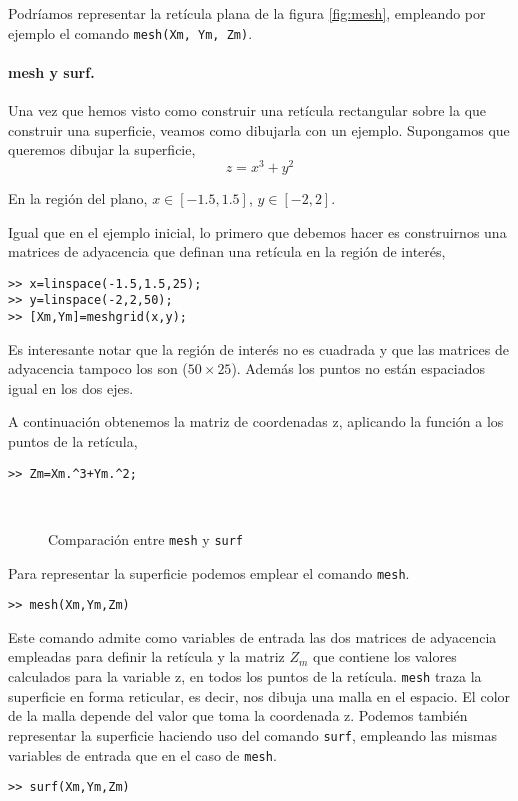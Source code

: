 Podríamos representar la retícula plana de la figura \ref{fig:mesh}, empleando por ejemplo el comando \texttt{mesh(Xm, Ym, Zm)}.

\paragraph{mesh y surf.} Una vez que hemos visto como construir una retícula rectangular sobre la que construir una superficie, veamos como dibujarla con un ejemplo. Supongamos que queremos dibujar la superficie,
\begin{equation*}
z=x^3+y^2
\end{equation*}

En la región del plano, $x\in[-1.5,1.5]$, $y\in[-2,2]$. 

Igual que en el ejemplo inicial, lo primero que debemos hacer es construirnos una matrices de adyacencia que definan una retícula en la región de interés,
\begin{verbatim}
>> x=linspace(-1.5,1.5,25);
>> y=linspace(-2,2,50);
>> [Xm,Ym]=meshgrid(x,y);
\end{verbatim}

Es interesante notar que la región de interés no es cuadrada y que las matrices de adyacencia tampoco los son ($50\times 25$). Además los puntos no están espaciados igual en los dos ejes.

A continuación obtenemos la matriz de coordenadas z, aplicando la función a los puntos de la retícula,

\begin{verbatim}
>> Zm=Xm.^3+Ym.^2;
\end{verbatim}

\begin{figure}[h]
\centering
{} \qquad 
{}\\
\caption{Comparación entre \texttt{mesh} y \texttt{surf}}
\end{figure}

Para representar la superficie podemos emplear el comando \texttt{mesh}. 
\begin{verbatim}
>> mesh(Xm,Ym,Zm)
\end{verbatim}

Este comando admite como variables de entrada las dos matrices de adyacencia empleadas para definir la retícula y la matriz $Z_m$ que contiene los valores calculados para la  variable z, en todos los puntos de la retícula. \texttt{mesh} traza la superficie en forma reticular, es decir, nos dibuja una malla en el espacio. El color de la malla depende del valor que toma la coordenada z. Podemos también representar la superficie haciendo uso del comando \texttt{surf}, empleando las mismas variables de entrada que en el caso de \texttt{mesh}. 
\begin{verbatim}
>> surf(Xm,Ym,Zm)
\end{verbatim}

